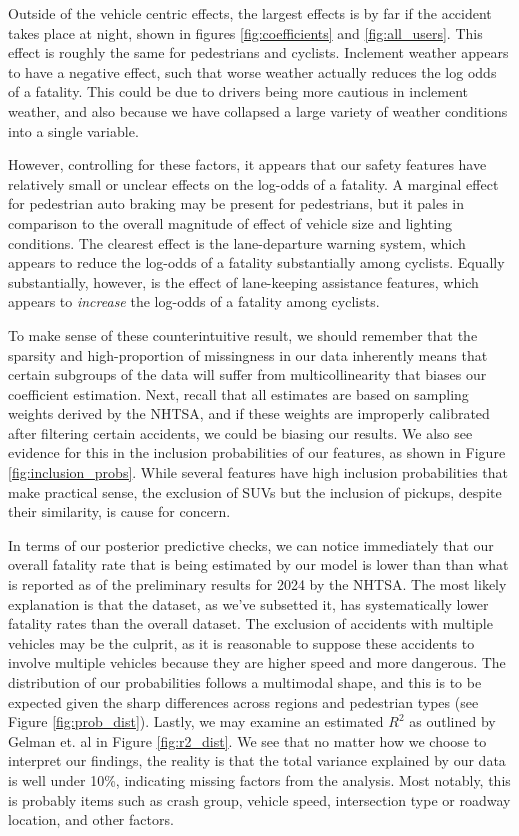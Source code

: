 \documentclass[12pt]{article}
\begin{document}
Outside of the vehicle centric effects, the largest effects is by far if the accident takes place at night, shown in
figures \ref{fig:coefficients} and \ref{fig:all_users}. This effect is roughly the same for pedestrians and cyclists.
Inclement weather appears to have a negative effect, such that
worse weather actually reduces the log odds of a fatality. This could be due to drivers being more cautious in
inclement weather, and also because we have collapsed a large variety of weather conditions into a single variable.

However, controlling for these factors, it appears that our safety features have relatively small or unclear effects on
the log-odds of a fatality. A marginal effect for pedestrian auto braking may be present for pedestrians, but it pales
in comparison to the overall magnitude of effect of vehicle size and lighting conditions.
The clearest effect is the lane-departure warning system, which appears to reduce the
log-odds of a fatality substantially among cyclists. Equally substantially, however, is the effect of lane-keeping
assistance features, which appears to \textit{increase} the log-odds of a fatality among cyclists.

To make sense of these counterintuitive result, we should remember that the sparsity and high-proportion of missingness
in our data inherently means that certain subgroups of the data will suffer from multicollinearity that biases
our coefficient estimation. Next, recall that all estimates are based on sampling weights derived by the NHTSA, and if
these weights are improperly calibrated after filtering certain accidents, we could be biasing our results.
We also see evidence for this in the inclusion probabilities of our features, as shown in 
Figure \ref{fig:inclusion_probs}. While several features have high inclusion probabilities that make practical sense, 
the exclusion of SUVs but the inclusion of pickups, despite their similarity, 
is cause for concern. 

In terms of our posterior predictive checks, we can notice immediately that our overall fatality
rate that is being estimated by our model is lower than than what is reported
as of the preliminary results for 2024 by the NHTSA. The most likely explanation is that the dataset, as we've subsetted
it, has systematically lower fatality rates than the overall dataset. The exclusion of accidents
with multiple vehicles may be the culprit, as it is reasonable to suppose these accidents to involve
multiple vehicles because they are higher speed and more dangerous. The distribution of our probabilities follows
a multimodal shape, and this is to be expected given the sharp differences across regions
and pedestrian types (see Figure \ref{fig:prob_dist}). Lastly, we may examine an estimated $R^2$ as outlined by
Gelman et. al\cite{gelman_r-squared_2019} in Figure \ref{fig:r2_dist}. We see that no matter how we choose to interpret
our findings, the reality is that the total variance explained by our data is well under 10\%, indicating missing factors
from the analysis. Most notably, this is probably items such as crash group, vehicle
speed, intersection type or roadway location, and other factors.
\end{document}
